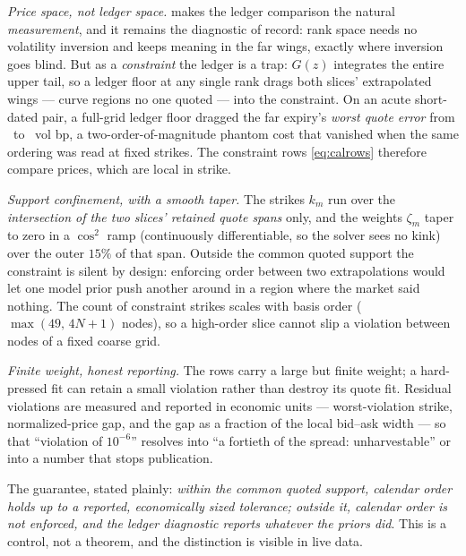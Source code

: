 \emph{Price space, not ledger space.}   makes the
ledger comparison the natural \emph{measurement}, and it remains the
diagnostic of record: rank space needs no volatility inversion and keeps
meaning in the far wings, exactly where inversion goes blind.  But as a
\emph{constraint} the ledger is a trap: $G(z)$ integrates the entire
upper tail, so a ledger floor at any single rank drags both slices'
extrapolated wings --- curve regions no one quoted --- into the
constraint.  On an acute short-dated pair, a full-grid ledger floor
dragged the far expiry's \emph{worst quote error} from
\MacPhantomDragFromBp\ to \MacPhantomDragToBp\ vol bp, a
two-order-of-magnitude phantom cost that vanished when the same
ordering was read at fixed strikes.  The constraint rows
\eqref{eq:calrows} therefore compare prices, which are local in
strike.

\emph{Support confinement, with a smooth taper.}  The strikes $k_m$ run
over the \emph{intersection of the two slices' retained quote spans}
only, and the weights $\zeta_m$ taper to zero in a $\cos^2$ ramp
(continuously differentiable, so the solver sees no kink) over the outer
$15\%$ of that span.  Outside the common quoted support the constraint
is silent by design: enforcing order between two extrapolations would
let one model prior push another around in a region where the market
said nothing.  The count of constraint strikes scales with basis order
($\max(49,\,4N+1)$ nodes), so a high-order slice cannot slip a violation
between nodes of a fixed coarse grid.

\emph{Finite weight, honest reporting.}  The rows carry a large but
finite weight; a hard-pressed fit can retain a small violation rather
than destroy its quote fit.  Residual violations are measured and
reported in economic units --- worst-violation strike, normalized-price
gap, and the gap as a fraction of the local bid--ask width --- so that
``violation of $10^{-6}$'' resolves into ``a fortieth of the spread:
unharvestable'' or into a number that stops publication.

The guarantee, stated plainly: \emph{within the common quoted support,
calendar order holds up to a reported, economically sized tolerance;
outside it, calendar order is not enforced, and the ledger diagnostic
reports whatever the priors did}.  This is a control, not a theorem, and
the distinction is visible in live data.

